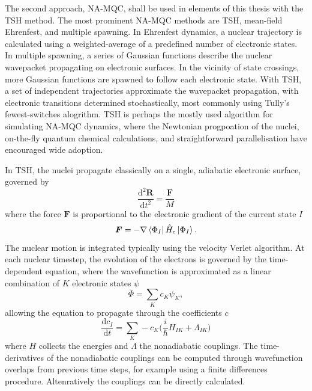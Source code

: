 The second approach, \ac{NA-MQC}, shall be used in elements of this thesis with the \ac{TSH} method. The most prominent \ac{NA-MQC} methods are \ac{TSH}, mean-field Ehrenfest, and multiple spawning.\cite{Crespo-Otero2018} In Ehrenfest dynamics, a nuclear trajectory is calculated using a weighted-average of a predefined number of electronic states. In multiple spawning, a series of Gaussian functions describe the nuclear wavepacket propagating on electronic surfaces. In the vicinity of state crossings, more Gaussian functions are spawned to follow each electronic state. With \ac{TSH}, a set of independent trajectories approximate the wavepacket propagation, with electronic transitions determined stochastically, most commonly using Tully's fewest-switches alogrithm.\cite{Tully1990} \ac{TSH} is perhaps the mostly used algorithm for simulating \ac{NA-MQC} dynamics, where the Newtonian progpoation of the nuclei, on-the-fly quantum chemical calculations, and straightforward parallelisation have encouraged wide adoption.\cite{Barbatti2011}

In \ac{TSH}, the nuclei propagate classically on a single, adiabatic electronic surface, governed by 
\begin{equation}\label{equation: nuclei_prop}
    \frac{\mathrm{d}^{2}\bm{R}}{\mathrm{d}t^{2}}=\frac{\bm{F}}{M}
\end{equation}
where the force $\bm{F}$ is proportional to the electronic gradient of the current state $I$
\begin{equation}
    \bm{F}=-\nabla{}\bra{\Phi_{I}}\hat{H}_{e}\ket{\Phi_{I}}.
\end{equation}
The nuclear motion is integrated typically using the velocity Verlet algorithm.\cite{Swope1982} At each nuclear timestep, the evolution of the electrons is governed by the time-dependent \schro{} equation, where the wavefunction is approximated as a linear combination of $K$ electronic states $\psi$
\begin{equation}
    \Phi{}=\sum_{K}c_{K}\psi_{K},
\end{equation}
allowing the \schro{} equation to propagate through the coefficients $c$
\begin{equation}\label{equation: sc-schro}
    \frac{\mathrm{d}c_{I}}{\mathrm{d}t}=\sum_{K}-c_{K}\big(\frac{i}{\hbar}H_{IK}+\Lambda_{IK}\big)
\end{equation}
where $H$ collects the energies and $\Lambda$ the nonadiabatic couplings. The time-derivatives of the nonadiabatic couplings can be computed through wavefunction overlaps from previous time steps, for example using a finite differences procedure.\cite{Pittner2009,Ryabinkin2015} Altenratively the couplings can be directly calculated.\cite{Crespo-Otero2018}

